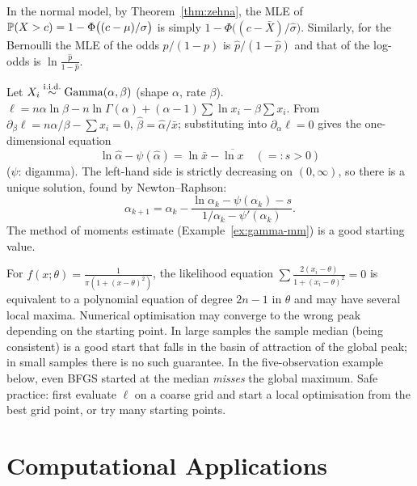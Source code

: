 \documentclass[main.tex]{subfiles}
\begin{document}
\begin{example}
In the normal model, by Theorem~\ref{thm:zehna}, the MLE of $\P(X>c)=1-\Phi\big((c-\mu)/\sigma\big)$ is simply $1-\Phi\big((c-\bar X)/\hat\sigma\big)$. Similarly, for the Bernoulli the MLE of the odds $p/(1-p)$ is $\hat p/(1-\hat p)$ and that of the log-odds is $\ln\frac{\hat p}{1-\hat p}$.
\end{example}

\begin{example}\label{ex:gamma-mle}
Let $X_i\iid\text{Gamma}(\alpha,\beta)$ (shape $\alpha$, rate $\beta$). $\ell=n\alpha\ln\beta-n\ln\Gamma(\alpha)+(\alpha-1)\sum\ln x_i-\beta\sum x_i$. From $\partial_\beta\ell=n\alpha/\beta-\sum x_i=0$, $\hat\beta=\hat\alpha/\bar x$; substituting into $\partial_\alpha\ell=0$ gives the one-dimensional equation
\[
\ln\hat\alpha-\psi(\hat\alpha)=\ln\bar x-\overline{\ln x}\quad(=:s>0)
\]
($\psi$: digamma). The left-hand side is strictly decreasing on $(0,\infty)$, so there is a unique solution, found by Newton--Raphson:
\[
\alpha_{k+1}=\alpha_k-\frac{\ln\alpha_k-\psi(\alpha_k)-s}{1/\alpha_k-\psi'(\alpha_k)} .
\]
The method of moments estimate (Example~\ref{ex:gamma-mm}) is a good starting value.
\end{example}

\begin{example}\label{ex:cauchy-mle}
For $f(x;\theta)=\frac{1}{\pi(1+(x-\theta)^2)}$, the likelihood equation $\sum\frac{2(x_i-\theta)}{1+(x_i-\theta)^2}=0$ is equivalent to a polynomial equation of degree $2n-1$ in $\theta$ and may have several local maxima. Numerical optimisation may converge to the wrong peak depending on the starting point. In large samples the sample median (being consistent) is a good start that falls in the basin of attraction of the global peak; in small samples there is no such guarantee. In the five-observation example below, even BFGS started at the median \emph{misses} the global maximum. Safe practice: first evaluate $\ell$ on a coarse grid and start a local optimisation from the best grid point, or try many starting points.
\end{example}

\section{Computational Applications}
\end{document}
